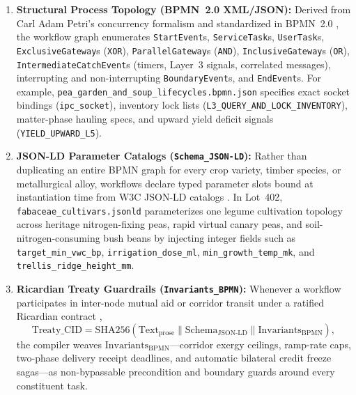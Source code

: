 \begin{enumerate}
\item \textbf{Structural Process Topology (BPMN~2.0 XML/JSON):} Derived from Carl Adam
        Petri's concurrency formalism \parencite{petri1962kommunikation} and standardized in
        BPMN~2.0 \parencite{omg2011bpmn,vanderaalst2016process}, the workflow graph
        enumerates \texttt{StartEvent}s, \texttt{ServiceTask}s, \texttt{UserTask}s,
        \texttt{ExclusiveGateway}s (\texttt{XOR}), \texttt{ParallelGateway}s (\texttt{AND}),
        \texttt{InclusiveGateway}s (\texttt{OR}), \texttt{IntermediateCatchEvent}s (timers,
        Layer~3 signals, correlated messages), interrupting and non-interrupting
        \texttt{BoundaryEvent}s, and \texttt{EndEvent}s. For example,
        \texttt{pea\_garden\_and\_soup\_lifecycles.bpmn.json} specifies exact socket
        bindings (\texttt{ipc\_socket}), inventory lock lists
        (\texttt{L3\_QUERY\_AND\_LOCK\_INVENTORY}), matter-phase hauling specs, and upward
        yield deficit signals (\texttt{YIELD\_UPWARD\_L5}).
\item \textbf{JSON-LD Parameter Catalogs (\texttt{Schema\_JSON-LD}):} Rather than
        duplicating an entire BPMN graph for every crop variety, timber species, or
        metallurgical alloy, workflows declare typed parameter slots bound at instantiation
        time from W3C JSON-LD catalogs \parencite{w3c2020jsonld}. In Lot~402,
        \texttt{fabaceae\_cultivars.jsonld} parameterizes one legume cultivation topology
        across heritage nitrogen-fixing peas, rapid virtual canary peas, and
        soil-nitrogen-consuming bush beans by injecting integer fields such as
        \texttt{target\_min\_vwc\_bp}, \texttt{irrigation\_dose\_ml},
        \texttt{min\_growth\_temp\_mk}, and \texttt{trellis\_ridge\_height\_mm}.
\item \textbf{Ricardian Treaty Guardrails (\texttt{Invariants\_BPMN}):} Whenever a workflow
        participates in inter-node mutual aid or corridor transit under a ratified Ricardian
        contract \parencite{grigg2004},
    \begin{equation}
    \mathrm{Treaty\_CID} = \mathrm{SHA256}\!\left(\mathrm{Text}_{\mathrm{prose}} \parallel \mathrm{Schema}_{\mathrm{JSON\text{-}LD}} \parallel \mathrm{Invariants}_{\mathrm{BPMN}}\right),
    \label{eq:ch2-treaty-cid}
    \end{equation}
the compiler weaves $\mathrm{Invariants}_{\mathrm{BPMN}}$---corridor exergy ceilings,
    ramp-rate caps, two-phase delivery receipt deadlines, and automatic bilateral credit
    freeze sagas---as non-bypassable precondition and boundary guards around every
    constituent task.
\end{enumerate}

